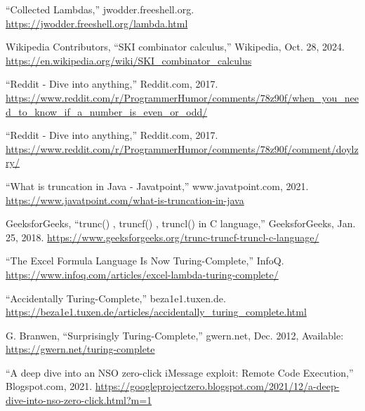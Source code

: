 \documentclass[12pt]{report} %
\begin{document}
\begin{singlespace}
\begin{thebibliography}{}
             “Collected Lambdas,” jwodder.freeshell.org. \href{https://jwodder.freeshell.org/lambda.html}{https://jwodder.freeshell.org/lambda.html}

             Wikipedia Contributors, “SKI combinator calculus,” Wikipedia, Oct. 28, 2024. \href{https://en.wikipedia.org/wiki/SKI_combinator_calculus}{https://en.wikipedia.org/wiki/SKI\_combinator\_calculus}

             “Reddit - Dive into anything,” Reddit.com, 2017. \href{https://www.reddit.com/r/ProgrammerHumor/comments/78z90f/when_you_need_to_know_if_a_number_is_even_or_odd/}{https://www.reddit.com/r/ProgrammerHu\-mor/comments/78z90f/when\_you\_need\_to\_know\_if\_a\_number\_is\_even\_or\_odd/} 

             “Reddit - Dive into anything,” Reddit.com, 2017. \href{https://www.reddit.com/r/ProgrammerHumor/comments/78z90f/comment/doylzry/}{https://www.reddit.com/r/ProgrammerHu\-mor/comments/78z90f/comment/doylzry/}

             “What is truncation in Java - Javatpoint,” www.javatpoint.com, 2021. \href{https://www.javatpoint.com/what-is-truncation-in-java}{https://www.javatpoint.com/what-is-truncation-in-java}

             GeeksforGeeks, “trunc() , truncf() , truncl() in C language,” GeeksforGeeks, Jan. 25, 2018. \href{https://www.geeksforgeeks.org/trunc-truncf-truncl-c-language/}{https://www.geeksforgeeks.org/trunc-truncf-truncl-c-language/}

             “The Excel Formula Language Is Now Turing-Complete,” InfoQ. \href{https://www.infoq.com/articles/excel-lambda-turing-complete/}{https://www.infoq.com/articles/excel-lambda-turing-complete/}

             “Accidentally Turing-Complete,” beza1e1.tuxen.de. \href{https://beza1e1.tuxen.de/articles/accidentally_turing_complete.html}{https://beza1e1.tuxen.de/articles/accident\-ally\_turing\_complete.html}

             G. Branwen, “Surprisingly Turing-Complete,” gwern.net, Dec. 2012, Available: \href{https://gwern.net/turing-complete}{https://gwern.net/turing-complete}

             “A deep dive into an NSO zero-click iMessage exploit: Remote Code Execution,” Blogspot.com, 2021. \href{https://googleprojectzero.blogspot.com/2021/12/a-deep-dive-into-nso-zero-click.html?m=1}{https://googleprojectzero.blogspot.com/2021/12/a-deep-dive-into-nso-zero-click.html?m=1}


\end{thebibliography}
\end{singlespace}
\end{document}
